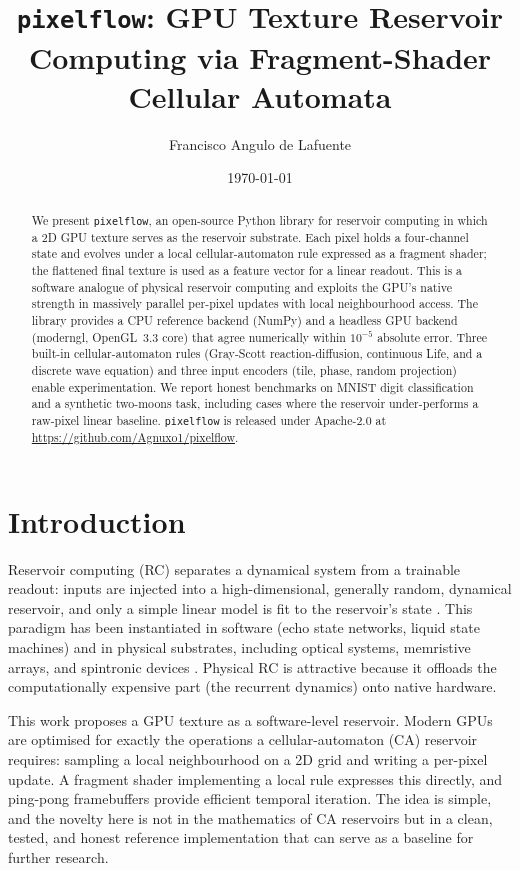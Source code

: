 \documentclass[11pt,a4paper]{article}
\title{\texttt{pixelflow}: GPU Texture Reservoir Computing via Fragment-Shader Cellular Automata}
\author{Francisco Angulo de Lafuente}
\affil{Independent Researcher \\ \texttt{lareliquia.angulo@gmail.com}}
\date{\today}
\begin{document}
\maketitle

\begin{abstract}
We present \texttt{pixelflow}, an open-source Python library for reservoir
computing in which a 2D GPU texture serves as the reservoir substrate. Each
pixel holds a four-channel state and evolves under a local cellular-automaton
rule expressed as a fragment shader; the flattened final texture is used as a
feature vector for a linear readout. This is a software analogue of physical
reservoir computing and exploits the GPU's native strength in massively
parallel per-pixel updates with local neighbourhood access. The library
provides a CPU reference backend (NumPy) and a headless GPU backend (moderngl,
OpenGL~3.3 core) that agree numerically within $10^{-5}$ absolute error. Three
built-in cellular-automaton rules (Gray-Scott reaction-diffusion, continuous
Life, and a discrete wave equation) and three input encoders (tile, phase,
random projection) enable experimentation. We report honest benchmarks on
MNIST digit classification and a synthetic two-moons task, including cases
where the reservoir under-performs a raw-pixel linear baseline. \texttt{pixelflow}
is released under Apache-2.0 at
\url{https://github.com/Agnuxo1/pixelflow}.
\end{abstract}

\section{Introduction}

Reservoir computing (RC) separates a dynamical system from a trainable
readout: inputs are injected into a high-dimensional, generally random,
dynamical reservoir, and only a simple linear model is fit to the reservoir's
state \citep{jaeger2001,maass2002}. This paradigm has been instantiated in
software (echo state networks, liquid state machines) and in physical
substrates, including optical systems, memristive arrays, and spintronic
devices \citep{tanaka2019}. Physical RC is attractive because it offloads the
computationally expensive part (the recurrent dynamics) onto native hardware.

This work proposes a GPU texture as a software-level reservoir. Modern GPUs
are optimised for exactly the operations a cellular-automaton (CA) reservoir
requires: sampling a local neighbourhood on a 2D grid and writing a per-pixel
update. A fragment shader implementing a local rule expresses this directly,
and ping-pong framebuffers provide efficient temporal iteration. The idea is
simple, and the novelty here is not in the mathematics of CA reservoirs but
in a clean, tested, and honest reference implementation that can serve as a
baseline for further research.
\end{document}
